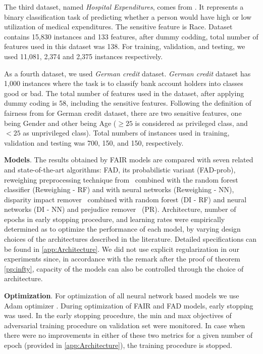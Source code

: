 \documentclass[preprint,12pt]{elsarticle}
\begin{document}
The third dataset, named \textit{Hospital Expenditures}, comes from \cite{bellamy2019ai}. It represents a binary classification task of predicting whether a person would have high or low utilization of medical expenditures. The sensitive feature is Race. Dataset contains 15,830 instances and 133 features, after dummy codding, total number of features used in this dataset was 138. For training, validation, and testing, we used 11,081, 2,374 and 2,375 instances respectively.

As a fourth dataset, we used \textit{German credit} dataset. \textit{German credit} dataset has 1,000 instances where the task is to classify bank account holders into classes good or bad. The total number of features used in the dataset, after applying dummy coding is 58, including the sensitive features. Following the definition of fairness from \cite{kamiran2012decision} for German credit dataset, there are two sensitive features, one being Gender and other being Age ($\geq 25$ is considered as privileged class, and $< 25$ as unprivileged class).  Total numbers of instances used in training, validation and testing was 700, 150, and 150, respectively.

\textbf{Models}. \sloppy The results obtained by FAIR models are compared with seven related and state-of-the-art algorithms: FAD, its probabilistic variant (FAD-prob), reweighing preprocessing technique from~\cite{kamiran2012data} combined with the random forest classifier (Reweighing - RF) and with neural networks (Reweighing - NN), disparity impact remover~\cite{feldman2015certifying} combined with random forest (DI - RF) and neural networks (DI - NN) and prejudice remover~\cite{kamishima2012fairness} (PR). Architecture, number of epochs in early stopping procedure, and learning rates were empirically determined as to optimize the performance of each model, by varying design choices of the architectures described in the literature. Detailed specifications can be found in \ref{app:Architecture}. We did not use explicit regularization in our experiments since, in accordance with the remark after the proof of theorem \ref{pp:infty}, capacity of the models can also be controlled through the choice of architecture.

\textbf{Optimization}.
For optimization of all neural network based models we use Adam optimizer \cite{KingmaB14}.
During optimization of FAIR and FAD models, early stopping was used. In the early stopping procedure, the min and max objectives of adversarial training procedure on validation set were monitored. In case when there were no improvements in either of these two metrics for a given number of epoch (provided in \ref{app:Architecture}), the training procedure is stopped.
\end{document}
